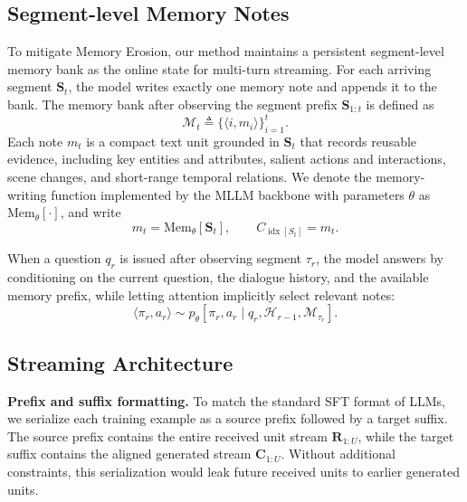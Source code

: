 \documentclass{article}
\begin{document}
\subsection{Segment-level Memory Notes}
\label{sec:method:memory}

To mitigate Memory Erosion, our method maintains a persistent segment-level memory bank as the online state for multi-turn streaming. For each arriving segment $\mathbf{S}_t$, the model writes exactly one memory note and appends it to the bank. The memory bank after observing the segment prefix $\mathbf{S}_{1:t}$ is defined as
\begin{equation}
\mathcal{M}_t \triangleq \{\langle i, m_i\rangle\}_{i=1}^{t}.
\end{equation}
Each note $m_t$ is a compact text unit grounded in $\mathbf{S}_t$ that records reusable evidence, including key entities and attributes, salient actions and interactions, scene changes, and short-range temporal relations. We denote the memory-writing function implemented by the MLLM backbone with parameters $\theta$ as $\mathrm{Mem}_\theta[\cdot]$, and write
\begin{equation}
m_t = \mathrm{Mem}_\theta[\mathbf{S}_t],
\qquad
C_{\operatorname{idx}[S_t]} = m_t .
\end{equation}

\noindent When a question $q_r$ is issued after observing segment $\tau_r$, the model answers by conditioning on the current question, the dialogue history, and the available memory prefix, while letting attention implicitly select relevant notes:
\begin{equation}
\langle \pi_r, a_r\rangle \sim
p_\theta\!\left[\pi_r, a_r \mid q_r, \mathcal{H}_{r-1}, \mathcal{M}_{\tau_r}\right].
\end{equation}

\subsection{Streaming Architecture}
\label{sec:method:train}

\noindent\textbf{Prefix and suffix formatting.}
To match the standard SFT format of LLMs, we serialize each training example as a source prefix followed by a target suffix. The source prefix contains the entire received unit stream $\mathbf{R}_{1:U}$, while the target suffix contains the aligned generated stream $\mathbf{C}_{1:U}$. Without additional constraints, this serialization would leak future received units to earlier generated units.
\end{document}
